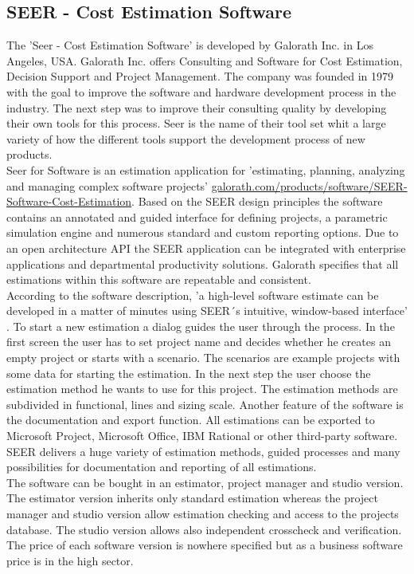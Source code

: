 \subsection{SEER - Cost Estimation Software}

The 'Seer - Cost Estimation Software' is developed by Galorath Inc. in Los Angeles, USA. Galorath Inc. offers Consulting and Software for Cost Estimation, Decision Support and Project Management. The company was founded in 1979 with the goal to improve the software and hardware development process in the industry. The next step was to improve their consulting quality by developing their own tools for this process. Seer is the name of their tool set whit a large variety of how the different tools support the development process of new products.
\\
Seer for Software is an estimation application for 'estimating, planning, analyzing and managing complex software projects' \url{galorath.com/products/software/SEER-Software-Cost-Estimation}. Based on the SEER design principles the software contains an annotated and guided interface for defining projects, a parametric simulation engine and numerous standard and custom reporting options. Due to an open architecture API the SEER application can be integrated with enterprise applications and departmental productivity solutions. Galorath specifies that all estimations within this software are repeatable and consistent.
\\
According to the software description, 'a high-level software estimate can be developed in a matter of minutes using SEER´s intuitive, window-based interface' \cite{pricesystems}. To start a new estimation a dialog guides the user through the process. In the first screen the user has to set project name and decides whether he creates an empty project or starts with a scenario. The scenarios are example projects with some data for starting the estimation. In the next step the user choose the estimation method he wants to use for this project. The estimation methods are subdivided in functional, lines and sizing scale. Another feature of the software is the documentation and export function. All estimations can be exported to Microsoft Project, Microsoft Office, IBM Rational or other third-party software. SEER delivers a huge variety of estimation methods, guided processes and many possibilities for documentation and reporting of all estimations.
\\
The software can be bought in an estimator, project manager and studio version. The estimator version inherits only standard estimation whereas the project manager and studio version allow estimation checking and access to the projects database. The studio version allows also independent crosscheck and verification. The price of each software version is nowhere specified but as a business software price is in the high sector.


